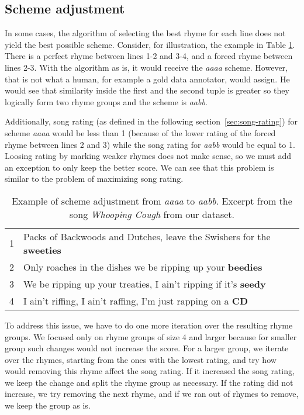 \subsection{Scheme adjustment}\label{sec:scheme-adjustment}
In some cases, the algorithm of selecting the best rhyme for each line does not yield the best possible scheme. Consider, for illustration, the example in Table \ref{scheme_adjustment}. There is a perfect rhyme between lines 1-2 and 3-4, and a forced rhyme between lines 2-3. With the algorithm as is, it would receive the \textit{aaaa} scheme. However, that is not what a human, for example a gold data annotator, would assign. He would see that similarity inside the first and the second tuple is greater so they logically form two rhyme groups and the scheme is \textit{aabb}. 

Additionally, song rating (as defined in the following section~\ref{sec:song-rating}) for scheme \textit{aaaa} would be less than 1 (because of the lower rating of the forced rhyme between lines 2 and 3) while the song rating for \textit{aabb} would be equal to 1. Loosing rating by marking weaker rhymes does not make sense, so we must add an exception to only keep the better score. We can see that this problem is similar to the problem of maximizing song rating. 

\begin{table}
	\begin{tabular}{l l}
		1&Packs of Backwoods and Dutches, leave the Swishers for the \textbf{sweeties}  \\
		2&Only roaches in the dishes we be ripping up your \textbf{beedies}  \\
		3&We be ripping up your treaties, I ain't ripping if it's \textbf{seedy}  \\
		4&I ain't riffing, I ain't raffing, I'm just rapping on a \textbf{CD} \\
	\end{tabular}
	\caption[Scheme adjustment example.]{Example of scheme adjustment from \textit{aaaa} to \textit{aabb}. Excerpt from the song \textit{Whooping Cough} from  our dataset.}
	\label{scheme_adjustment}
\end{table}

To address this issue, we have to do one more iteration over the resulting rhyme groups. We focused only on rhyme groups of size 4 and larger because for smaller group such changes would not increase the score. For a larger group, we iterate over the rhymes, starting from the ones with the lowest rating, and try how would removing this rhyme affect the song rating. If it increased the song rating, we keep the change and split the rhyme group as necessary. If the rating did not increase, we try removing the next rhyme, and if we ran out of rhymes to remove, we keep the group as is.

